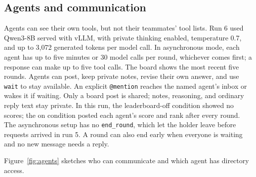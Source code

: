 \documentclass{article}
\newcommand{\tool}[1]{\texttt{#1}}
\begin{document}
\subsection{Agents and communication}
Agents can see their own tools, but not their teammates' tool lists. Run 6 used Qwen3-8B served with vLLM, with private thinking enabled, temperature 0.7, and up to 3,072 generated tokens per model call. In asynchronous mode, each agent has up to five minutes or 30 model calls per round, whichever comes first; a response can make up to five tool calls. The board shows the most recent five rounds. Agents can post, keep private notes, revise their own answer, and use \tool{wait} to stay available. An explicit \texttt{@mention} reaches the named agent's inbox or wakes it if waiting. Only a board post is shared; notes, reasoning, and ordinary reply text stay private. In this run, the leaderboard-off condition showed no scores; the on condition posted each agent's score and rank after every round. The asynchronous setup has no \tool{end\_round}, which let the holder leave before requests arrived in run 5. A round can also end early when everyone is waiting and no new message needs a reply.

Figure~\ref{fig:agents} sketches who can communicate and which agent has directory access.
\end{document}
